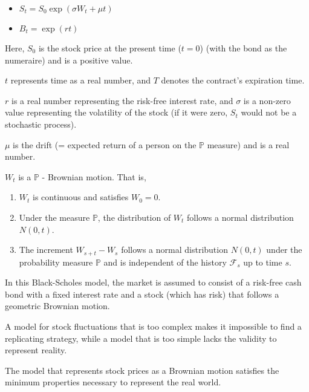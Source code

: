 \documentclass[uplatex,a4j,12pt,dvipdfmx]{jsarticle}
\begin{document}
\begin{itemize}
	\item $S_{t} = S_{0} \exp (\sigma W_{t} + \mu t)$
	\item $B_{t} = \exp (rt)$
\end{itemize}

Here, $S_{0}$ is the stock price at the present time ($t=0$) (with the bond as the numeraire) and is a positive value.

$t$ represents time as a real number, and $T$ denotes the contract's expiration time.

$r$ is a real number representing the risk-free interest rate, and $\sigma$ is a non-zero value representing the volatility of the stock (if it were zero, $S_{t}$ would not be a stochastic process).

$\mu$ is the drift (= expected return of a person on the $\mathbb{P}$ measure) and is a real number.

$W_{t}$ is a $\mathbb{P}$ - Brownian motion. That is,
\begin{enumerate}
	\item $W_{t}$ is continuous and satisfies $W_{0} = 0$.
	\item Under the measure $\mathbb{P}$, the distribution of $W_{t}$ follows a normal distribution $N(0,t)$.
	\item The increment $W_{s+t} - W_{s}$ follows a normal distribution $N(0,t)$ under the probability measure $\mathbb{P}$ and is independent of the history $\mathcal{F}_{s}$ up to time $s$.
\end{enumerate}

In this Black-Scholes model, the market is assumed to consist of a risk-free cash bond with a fixed interest rate and a stock (which has risk) that follows a geometric Brownian motion.

A model for stock fluctuations that is too complex makes it impossible to find a replicating strategy, while a model that is too simple lacks the validity to represent reality.

The model that represents stock prices as a Brownian motion satisfies the minimum properties necessary to represent the real world.
\end{document}
